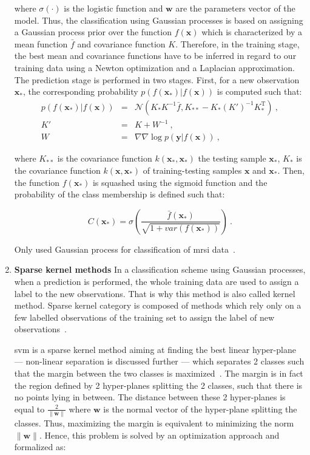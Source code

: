 \begin{enumerate}[leftmargin=*]
  \noindent where $\sigma(\cdot)$ is the logistic function and $\mathbf{w}$ are
  the parameters vector of the model.
  Thus, the classification using Gaussian processes is based on assigning a
  Gaussian process prior over the function $f(\mathbf{x})$ which is
  characterized by a mean function $\bar{f}$ and covariance function $K$.
  Therefore, in the training stage, the best mean and covariance functions have
  to be inferred in regard to our training data using a Newton optimization and
  a Laplacian approximation.
  The prediction stage is performed in two stages.
  First, for a new observation $\mathbf{x}_*$, the corresponding probability
  $p(f(\mathbf{x}_*)|f(\mathbf{x}))$ is computed such that:
  \begin{eqnarray}
    p(f(\mathbf{x}_*)|f(\mathbf{x})) & = & \mathcal{N}( K_*K^{-1}\bar{f}, K_{**}-K_*(K')^{-1}K_*^{\text{T}} ) \ , \nonumber \\
    K' & = & K + W^{-1} \ , \label{eq:gp2} \\
    W & = & \nabla \nabla \log p(\mathbf{y}|f(\mathbf{x})) \ , \nonumber
  \end{eqnarray}

  \noindent where $K_{**}$ is the covariance function $k(\mathbf{x}_*,
  \mathbf{x}_*)$ the testing sample $\mathbf{x}_*$, $K_{*}$ is the covariance
  function $k(\mathbf{x}, \mathbf{x}_*)$ of training-testing samples
  $\mathbf{x}$ and $\mathbf{x}_*$.
  Then, the function $f(\mathbf{x}_*)$ is squashed using the sigmoid function
  and the probability of the class membership is defined such that:

  \begin{equation}
    C(\mathbf{x}_*) = \sigma\left( \frac{\bar{f}(\mathbf{x_*})}{\sqrt{1+var(f(\mathbf{x}_*))}} \right) \ .
    \label{eq:gp3}
  \end{equation}

  Only \citeauthor{Kelm2007} used Gaussian process for classification of
  \ac{mrsi} data~\cite{Kelm2007}.

\item[] \textbf{Sparse kernel methods}
  In a classification scheme using Gaussian processes, when a prediction is
  performed, the whole training data are used to assign a label to the new
  observations.
  That is why this method is also called kernel method.
  Sparse kernel category is composed of methods which rely only on a few
  labelled observations of the training set to assign the label of new
  observations~\cite{Bishop2006}.

  \Acf{svm} is a sparse kernel method aiming at finding the best linear
  hyper-plane --- non-linear separation is discussed further --- which
  separates 2 classes such that the margin between the two classes is
  maximized~\cite{Vapnik1963}.
  The margin is in fact the region defined by 2 hyper-planes splitting the 2
  classes, such that there is no points lying in between.
  The distance between these 2 hyper-planes is equal to
  $\frac{2}{\|\mathbf{w}\|}$ where $\mathbf{w}$ is the normal vector of the
  hyper-plane splitting the classes.
  Thus, maximizing the margin is equivalent to minimizing the norm
  $\|\mathbf{w}\|$.
  Hence, this problem is solved by an optimization approach and formalized as:


\end{enumerate}
